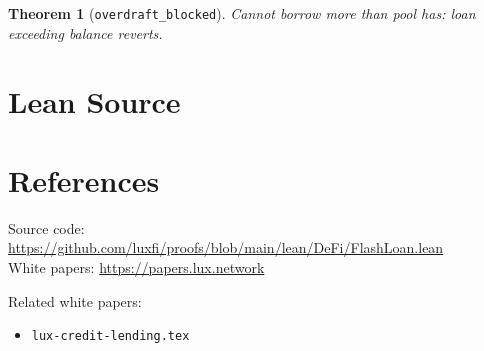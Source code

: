 \documentclass[11pt]{article}
\newtheorem{theorem}{Theorem}
\begin{document}
\begin{theorem}[\texttt{overdraft\_blocked}]
Cannot borrow more than pool has: loan exceeding balance reverts.
\end{theorem}


\section{Lean Source}


\section{References}
\noindent Source code: \url{https://github.com/luxfi/proofs/blob/main/lean/DeFi/FlashLoan.lean}\\
\noindent White papers: \url{https://papers.lux.network}

\noindent Related white papers:
\begin{itemize}
  \item \texttt{lux-credit-lending.tex}
\end{itemize}
\end{document}
